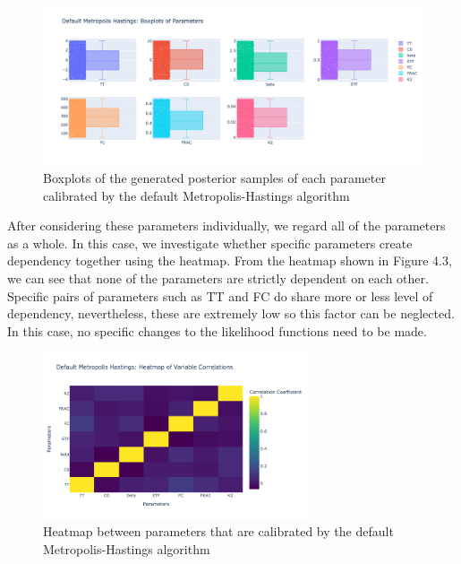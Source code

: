 \begin{figure}[H]
    \centering
    \includegraphics[width=1\textwidth]{figures/basic_mh/default_mh/default_mh_boxplot.png}
    \captionsetup{width=.8\textwidth}
    \caption{Boxplots of the generated posterior samples of each parameter calibrated by the default Metropolis-Hastings algorithm}
    \label{fig:enter-label}
\end{figure}



After considering these parameters individually, we regard all of the parameters as a whole. In this case, we investigate whether specific parameters create dependency together using the heatmap. From the heatmap shown in Figure 4.3, we can see that none of the parameters are strictly dependent on each other. Specific pairs of parameters such as TT and FC do share more or less level of dependency, nevertheless, these are extremely low so this factor can be neglected. In this case, no specific changes to the likelihood functions need to be made.


\begin{figure}[H]
    \centering
    \includegraphics[width=0.7\textwidth]{figures/basic_mh/default_mh/default_mh_heatmap.png}
    \captionsetup{width=.8\textwidth}
    \caption{Heatmap between parameters that are calibrated by the default Metropolis-Hastings algorithm}
    \label{fig:enter-label}
\end{figure}


